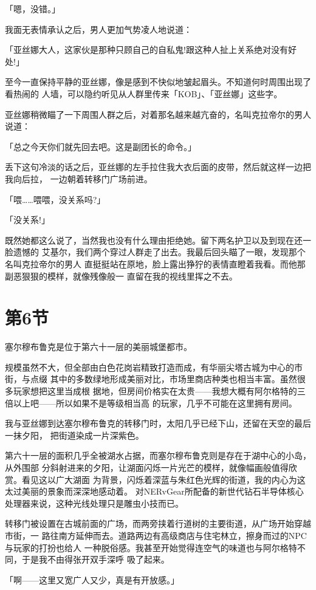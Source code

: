 \documentclass[11pt]{book}
\begin{document}
「嗯，没错。」

我面无表情承认之后，男人更加气势凌人地说道：

「亚丝娜大人，这家伙是那种只顾自己的自私鬼!跟这种人扯上关系绝对没有好处!」

至今一直保持平静的亚丝娜，像是感到不快似地皱起眉头。不知道何时周围出现了看热闹的
人墙，可以隐约听见从人群里传来「KOB」、「亚丝娜」这些字。

亚丝娜稍微瞄了一下周围人群之后，对着那名越来越亢奋的，名叫克拉帝尔的男人说道：

「总之今天你们就先回去吧。这是副团长的命令。」

丢下这句冷淡的话之后，亚丝娜的左手拉住我大衣后面的皮带，然后就这样一边把我向后拉，
一边朝着转移门广场前进。

「喂……喂喂，没关系吗?」

「没关系!」

既然她都这么说了，当然我也没有什么理由拒绝她。留下两名护卫以及到现在还一脸遗憾的
艾基尔，我们两个穿过人群走了出去。我最后回头瞄了一眼，发现那个名叫克拉帝尔的男人
直挺挺站在原地，脸上露出狰狞的表情直瞪着我看。而他那副恶狠狠的模样，就像残像般一
直留在我的视线里挥之不去。
\section{第6节}
\label{sec:orgb786add}
塞尔穆布鲁克是位于第六十一层的美丽城堡都市。

规模虽然不大，但全部由白色花岗岩精致打造而成，有华丽尖塔古城为中心的市街，与点缀
其中的多数绿地形成美丽对比，市场里商店种类也相当丰富。虽然很多玩家想把这里当成根
据地，但房间价格实在太贵——我想大概有阿尔格特的三倍以上吧——所以如果不是等级相当高
的玩家，几乎不可能在这里拥有房间。

我与亚丝娜到达塞尔穆布鲁克的转移门时，太阳几乎已经下山，还留在天空的最后一抹夕阳，
把街道染成一片深紫色。

第六十一层的面积几乎全被湖水占据，而塞尔穆布鲁克则是存在于湖中心的小岛，从外围部
分斜射进来的夕阳，让湖面闪烁一片光芒的模样，就像幅画般值得欣赏。看见这以广大湖面
为背景，闪烁着深蓝与朱红色光辉的街道，我的内心为这太过美丽的景象而深深地感动着。
对NERvGear所配备的新世代钻石半导体核心处理器来说，这种光线处理只是雕虫小技而已。

转移门被设置在古城前面的广场，而两旁挟着行道树的主要街道，从广场开始穿越市街，一
路往南方延伸而去。道路两边有高级商店与住宅林立，擦身而过的NPC与玩家的打扮也给人
一种脱俗感。我甚至开始觉得连空气的味道也与阿尔格特不同，于是我不由得张开双手深呼
吸了起来。

「啊——这里又宽广人又少，真是有开放感。」
\end{document}
